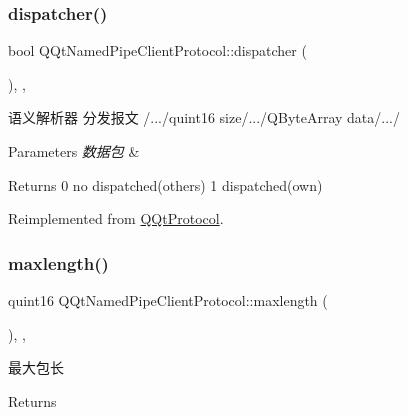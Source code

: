 \subsubsection{\texorpdfstring{dispatcher()}{dispatcher()}}
{\footnotesize\ttfamily bool Q\+Qt\+Named\+Pipe\+Client\+Protocol\+::dispatcher (\begin{DoxyParamCaption}\item[{const Q\+Byte\+Array \&}]{ }\end{DoxyParamCaption})\hspace{0.3cm}{\ttfamily [override]}, {\ttfamily [protected]}, {\ttfamily [virtual]}}



语义解析器 分发报文 /.../quint16 size/.../\+Q\+Byte\+Array data/.../ 


\begin{DoxyParams}{Parameters}
{\em 数据包} & \\
\hline
\end{DoxyParams}
\begin{DoxyReturn}{Returns}
0 no dispatched(others) 1 dispatched(own) 
\end{DoxyReturn}


Reimplemented from \mbox{\hyperlink{class_q_qt_protocol_a35a69c4b89c8cf7459038f40d75e0dc9}{Q\+Qt\+Protocol}}.

\mbox{\label{class_q_qt_named_pipe_client_protocol_a79ee5699908d79e62fcb52519ddf79fe}} 
\subsubsection{\texorpdfstring{maxlength()}{maxlength()}}
{\footnotesize\ttfamily quint16 Q\+Qt\+Named\+Pipe\+Client\+Protocol\+::maxlength (\begin{DoxyParamCaption}{ }\end{DoxyParamCaption})\hspace{0.3cm}{\ttfamily [override]}, {\ttfamily [protected]}, {\ttfamily [virtual]}}



最大包长 

\begin{DoxyReturn}{Returns}

\end{DoxyReturn}


